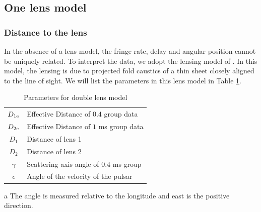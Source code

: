 \documentclass[useAMS,usenatbib]{mn2e}
\begin{document}
\subsection{One lens model}
\subsubsection{Distance to the lens}
In the absence of a lens model, the
fringe rate, delay and angular position cannot be uniquely related. To interpret the data, we adopt the lensing model of
\citet{2014MNRAS.442.3338P}.  In this model, the lensing is due to projected fold caustics of a thin sheet closely aligned to the line of sight. We will list the parameters in this lens model in Table \ref{tab:parameters}.

\begin{table}
\caption{Parameters for double lens model}
\begin{threeparttable}
\begin{tabular}{cl}
\hline
$D_{1\rm e}$  & 
Effective Distance of $0.4$ group data\\
$D_{2\rm e}$ 
	&  Effective Distance of $1$ ms group data\\
$D_1$ 		&  Distance of lens 1 \\
$D_2$	& Distance of lens 2 \\
$\gamma$ &  Scattering axis angle of $0.4$ ms group\tnote{a} \\
$\epsilon$	& Angle of the velocity of the pulsar\tnote{a}\\
\hline
\end{tabular}

\begin{tablenotes}
\item[a]{The angle is measured relative to the longitude and east is the positive direction.}
\end{tablenotes}
\label{tab:parameters}
\end{threeparttable}
\end{table}


\end{document}
